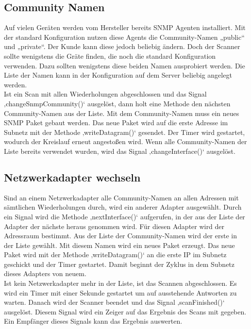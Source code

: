 \documentclass[11pt,a4paper]{article}
\begin{document}
\subsection{Community Namen}
Auf vielen Geräten werden vom Hersteller bereits SNMP Agenten installiert. Mit der standard Konfiguration nutzen diese Agents die Community-Namen „public“ und „private“. Der Kunde kann diese jedoch beliebig ändern. Doch der Scanner sollte wenigstens die Gräte finden, die noch die standard Konfiguration verwenden. Dazu sollten wenigstens diese beiden Namen ausprobiert werden. Die Liste der Namen kann in der Konfiguration auf dem Server beliebig angelegt werden.\\
Ist ein Scan mit allen Wiederholungen abgeschlossen und das Signal ‚changeSnmpCommunity()‘ ausgelöst, dann holt eine Methode den nächsten Community-Namen aus der Liste. Mit dem Community-Namen muss ein neues SNMP Paket gebaut werden. Das neue Paket wird auf die erste Adresse im Subnetz mit der Methode ‚writeDatagram()‘ gesendet. Der Timer wird gestartet, wodurch der Kreislauf erneut angestoßen wird.
Wenn alle Community-Namen der Liste bereits verwendet wurden, wird das Signal ‚changeInterface()‘ ausgelöst.\\

\subsection{Netzwerkadapter wechseln}
Sind an einem Netzwerkadapter alle Community-Namen an allen Adressen mit sämtlichen Wiederholungen durch, wird ein anderer Adapter ausgewählt. Durch ein Signal wird die Methode ‚nextInterface()‘ aufgerufen, in der aus der Liste der Adapter der nächste heraus genommen wird. Für diesen Adapter wird der Adressraum bestimmt. Aus der Liste der Community-Namen wird der erste in der Liste gewählt. Mit diesem Namen wird ein neues Paket erzeugt. Das neue Paket wird mit der Methode ‚writeDatagram()‘ an die erste IP im Subnetz geschickt und der Timer gestartet. Damit beginnt der Zyklus in dem Subnetz dieses Adapters von neuem.\\
Ist kein Netzwerkadapter mehr in der Liste, ist das Scannen abgeschlossen. Es wird ein Timer mit einer Sekunde gestartet um auf ausstehende Antworten zu warten. Danach wird der Scanner beendet und das Signal ‚scanFinished()‘ ausgelöst. Diesem Signal wird ein Zeiger auf das Ergebnis des Scans mit gegeben. Ein Empfänger dieses Signals kann das Ergebnis auswerten.\\
\end{document}

